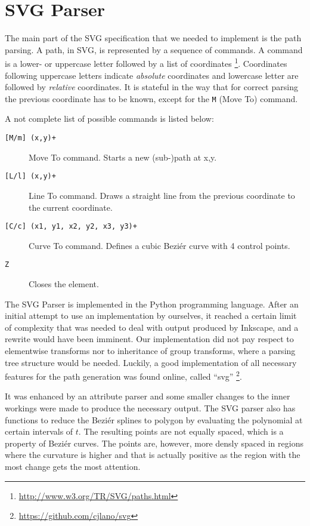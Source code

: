 \section{SVG Parser}

The main part of the SVG specification that we needed to implement is the path parsing. A path, in SVG, is represented by a sequence of commands. A command is a lower- or uppercase letter followed by a list of coordinates
\footnote{\url{http://www.w3.org/TR/SVG/paths.html}}. Coordinates following uppercase letters indicate \textit{absolute} coordinates and lowercase letter are followed by \textit{relative} coordinates. It is stateful in the way that for correct parsing the previous coordinate has to be known, except for the \texttt{M} (Move To) command.

A not complete list of possible commands is listed below:

\begin{description}
\item[\texttt{[M/m] (x,y)+}] Move To command. Starts a new (sub-)path at x,y.
\item[\texttt{[L/l] (x,y)+}] Line To command. Draws a straight line from the previous coordinate to the current coordinate.
\item[\texttt{[C/c] (x1, y1, x2, y2, x3, y3)+}] Curve To command. Defines a cubic Beziér curve with 4 control points.
\item[\texttt{Z}] Closes the element.
\end{description} 

The SVG Parser is implemented in the Python programming language. After an initial attempt to use an implementation by ourselves, it reached a certain limit of complexity that was needed to deal with output produced by Inkscape, and a rewrite would have been imminent. Our implementation did not pay respect to elementwise transforms nor to inheritance of group transforms, where a parsing tree structure would be needed. Luckily, a good implementation of all necessary features for the path generation was found online, called \enquote{svg} \footnote{\url{https://github.com/cjlano/svg}}.

It was enhanced by an attribute parser and some smaller changes to the inner workings were made to produce the necessary output. The SVG parser also has functions to reduce the Beziér splines to polygon by evaluating the polynomial at certain intervals of $t$. The resulting points are not equally spaced, which is a property of Beziér curves. The points are, however, more densly spaced in regions where the curvature is higher and that is actually positive as the region with the most change gets the most attention. 

